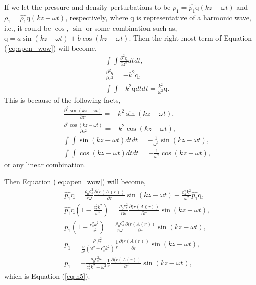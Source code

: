 If we let the pressure and density perturbations to be $p_1=\hat{p_1}\mathrm{q}(kz-\omega t)$ and $\rho_1=\hat{\rho_1}\mathrm{q}(kz-\omega t)$, respectively, where $\mathrm{q}$ is representative of a harmonic wave, i.e., it could be $\cos$, $\sin$ or some combination such as, $\mathrm{q} = a \sin(kz-\omega t) + b \cos(kz-\omega t)$.
Then the right most term of Equation (\ref{eq:apen_wow}) will become,
\begin{align}
&&\int\int \frac{\partial^2 \mathrm{q}}{\partial z^2} dt dt,\\
&&\frac{\partial^2 q}{\partial z^2} = - k^2 \mathrm{q},\\
&&\int\int - k^2 \mathrm{q} dt dt = \frac{k^2}{\omega^2}\mathrm{q}.
\end{align}
This is because of the following facts,
\begin{align}
&&\frac{\partial^2 \sin(kz-\omega t)}{\partial z^2} = -k^2\sin(kz-\omega t),\\
&&\frac{\partial^2 \cos(kz-\omega t)}{\partial z^2} = -k^2\cos(kz-\omega t),\\
&&\int\int \sin(kz-\omega t) dt dt = -\frac{1}{\omega^2}\sin(kz-\omega t),\\
&&\int\int \cos(kz-\omega t) dt dt = -\frac{1}{\omega^2}\cos(kz-\omega t),
\end{align}
or any linear combination.

Then Equation (\ref{eq:apen_wow}) will become,
\begin{align}
&& \hat{p_1}\mathrm{q} = \frac{\rho_0 c_s^2}{r\omega}\frac{\partial(r(A(r))}{\partial r} \sin(kz-\omega t) + \frac{c_s^2 k^2}{\omega^2}\hat{p_1}\mathrm{q},\\
&& \hat{p_1}\mathrm{q}\left(1 - \frac{c_s^2 k^2}{\omega^2} \right) = \frac{\rho_0 c_s^2}{r\omega}\frac{\partial(r(A(r))}{\partial r} \sin(kz-\omega t),\\
&& p_1\left(1 - \frac{c_s^2 k^2}{\omega^2} \right) = \frac{\rho_0 c_s^2}{r\omega}\frac{\partial(r(A(r))}{\partial r} \sin(kz-\omega t),\\
&& p_1 = \frac{\rho_0 c_s^2}{\frac{\omega}{\omega^2}(\omega^2- c_s^2k^2)}\frac{1}{r}\frac{\partial(r(A(r))}{\partial r} \sin(kz-\omega t),\\
&& p_1 = -\frac{\rho_0 c_s^2 \omega}{c_s^2k^2 - \omega^2}\frac{1}{r}\frac{\partial(r(A(r))}{\partial r} \sin(kz-\omega t),
\end{align}
which is Equation (\ref{eq:n5}).